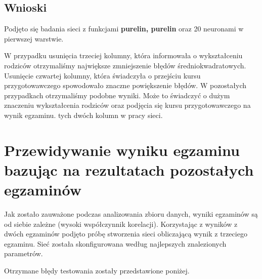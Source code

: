 \documentclass[12pt]{article}
\begin{document}
\subsection{Wnioski}
Podjęto się badania sieci z funkcjami \textbf{purelin, purelin} oraz 20 neuronami w pierwszej warstwie. 

W przypadku usunięcia trzeciej kolumny, która informowała o wykształceniu rodziców otrzymaliśmy największe zmniejszenie błędów średniokwadratowych. Usunięcie czwartej kolumny, która świadczyła o przejściu kursu przygotowawczego spowodowało znaczne powiększenie błędów. W pozostałych przypadkach otrzymaliśmy podobne wyniki. Może to świadczyć o dużym znaczeniu wykształcenia rodziców oraz podjęcia się kursu przygotowawczego na wynik egzaminu. tych dwóch kolumn w pracy sieci.

\pagebreak
\section{Przewidywanie wyniku egzaminu bazując na rezultatach pozostałych egzaminów}
Jak zostało zauważone podczas analizowania zbioru danych, wyniki egzaminów są od siebie zależne (wysoki współczynnik korelacji). Korzystając z wyników z dwóch egzaminów podjęto próbę stworzenia sieci obliczającą wynik z trzeciego egzaminu. Sieć została skonfigurowana według najlepszych znalezionych parametrów.

Otrzymane błędy testowania zostały przedstawione poniżej.
\end{document}
